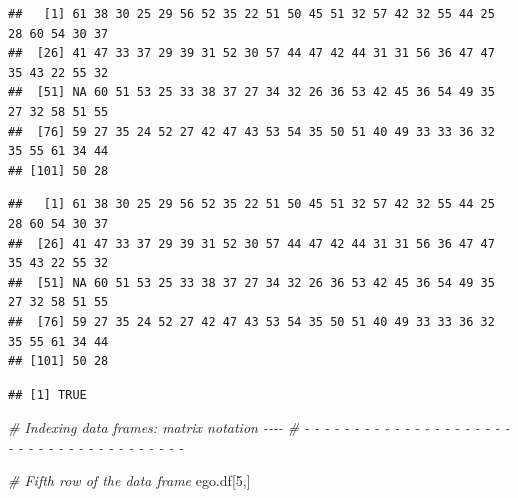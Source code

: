 \documentclass[
]{book}
\newenvironment{Shaded}{\begin{snugshade}}{\end{snugshade}}
\newcommand{\CommentTok}[1]{\textcolor[rgb]{0.56,0.35,0.01}{\textit{#1}}}
\newcommand{\DecValTok}[1]{\textcolor[rgb]{0.00,0.00,0.81}{#1}}
\newcommand{\FunctionTok}[1]{\textcolor[rgb]{0.00,0.00,0.00}{#1}}
\newcommand{\NormalTok}[1]{#1}
\newcommand{\SpecialCharTok}[1]{\textcolor[rgb]{0.00,0.00,0.00}{#1}}
\begin{document}
\begin{verbatim}
##   [1] 61 38 30 25 29 56 52 35 22 51 50 45 51 32 57 42 32 55 44 25 28 60 54 30 37
##  [26] 41 47 33 37 29 39 31 52 30 57 44 47 42 44 31 31 56 36 47 47 35 43 22 55 32
##  [51] NA 60 51 53 25 33 38 37 27 34 32 26 36 53 42 45 36 54 49 35 27 32 58 51 55
##  [76] 59 27 35 24 52 27 42 47 43 53 54 35 50 51 40 49 33 33 36 32 35 55 61 34 44
## [101] 50 28
\end{verbatim}

\begin{Shaded}
\end{Shaded}

\begin{verbatim}
##   [1] 61 38 30 25 29 56 52 35 22 51 50 45 51 32 57 42 32 55 44 25 28 60 54 30 37
##  [26] 41 47 33 37 29 39 31 52 30 57 44 47 42 44 31 31 56 36 47 47 35 43 22 55 32
##  [51] NA 60 51 53 25 33 38 37 27 34 32 26 36 53 42 45 36 54 49 35 27 32 58 51 55
##  [76] 59 27 35 24 52 27 42 47 43 53 54 35 50 51 40 49 33 33 36 32 35 55 61 34 44
## [101] 50 28
\end{verbatim}

\begin{Shaded}
\end{Shaded}

\begin{verbatim}
## [1] TRUE
\end{verbatim}

\begin{Shaded}
\begin{Highlighting}[]
\CommentTok{\# Indexing data frames: matrix notation                                     {-}{-}{-}{-}}
\CommentTok{\# {-} {-} {-} {-} {-} {-} {-} {-} {-} {-} {-} {-} {-} {-} {-} {-} {-} {-} {-} {-} {-} {-} {-} {-} {-} {-} {-} {-} {-} {-} {-} {-} {-} {-} {-} {-} {-} {-} {-} }

\CommentTok{\# Fifth row of the data frame}
\NormalTok{ego.df[}\DecValTok{5}\NormalTok{,]}
\end{Highlighting}
\end{Shaded}
\end{document}
